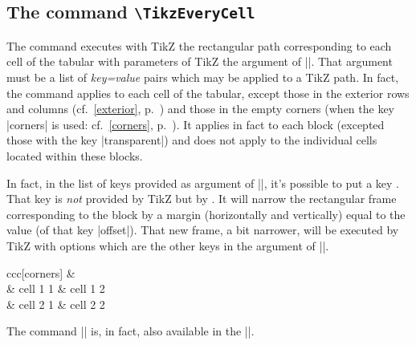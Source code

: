 \documentclass[dvipsnames]{article}
\begin{document}
\subsection{The command \texttt{\textbackslash TikzEveryCell}}


\label{TikzEveryCell}

The command  executes with TikZ the rectangular
path corresponding to each cell of the tabular with parameters of TikZ the
argument of |\TikzEveryCell|. That argument must be a list of \textsl{key=value}
pairs which may be applied to a TikZ path. In fact, the command applies to each cell
of the tabular, except those in the exterior rows and columns
(cf.~\ref{exterior}, p.~\pageref{exterior}) and those in the empty corners (when the key
|corners| is used: cf.~\ref{corners}, p.~\pageref{corners}). It applies in fact to each block
(excepted those with the key |transparent|) and does not apply to the individual
cells located within these blocks.  

\medskip
In fact, in the list of keys provided as argument of |\TikzEveryCell|, it's
possible to put a key . That key is \emph{not} provided by TikZ but by
. It will narrow the rectangular frame corresponding to the
block by a margin (horizontally and vertically) equal to the value (of that key
|offset|). That new frame, a bit narrower, will be executed by TikZ with options
which are the other keys in the argument of |\TikzEveryCell|.

\bigskip
\begin{Code}[width=9cm,show-output]
\renewcommand{\arraystretch}{1.3}
\begin{NiceTabular}{ccc}[corners]
  &  \\
  & cell 1 1 & cell 1 2 \\
  & cell 2 1 & cell 2 2
\CodeAfter
  \emph{}
\end{NiceTabular}
\end{Code}

\bigskip
The command |\TikzEveryCell| is, in fact, also available in the |\CodeBefore|.
\end{document}
